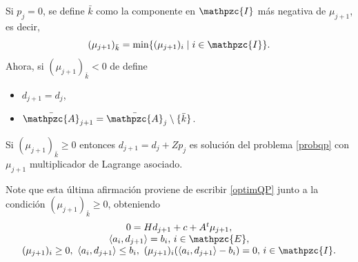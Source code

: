 \documentclass[a4paper,10pt]{book}
\newcommand{\cI}{\mathpzc{I}}
\newcommand{\cE}{\mathpzc{E}}
\newcommand{\cA}{\mathpzc{A}}
\newcommand{\la}{\langle}
\newcommand{\ra}{\rangle}
\begin{document}
Si $p_j=0$, se define $\bar k$ como la componente en $\cI$ más negativa de $\mu_{j+1}$, es decir,
\[
 (\mu_{j+1})_{\bar k}=\min\{(\mu_{j+1})_i\mid i\in\cI\}.
\]
Ahora, si $(\mu_{j+1})_{\bar k}<0$ de define
\begin{itemize}
 \item $d_{j+1}=d_j$,
 \item $\bar\cA_{j+1}=\bar\cA_j\setminus\{\bar k\}$.
\end{itemize}
Si $(\mu_{j+1})_{\bar k}\geq 0$ entonces $d_{j+1}=d_j+Zp_j$ es solución del problema \eqref{probqp} con $\mu_{j+1}$ multiplicador de Lagrange asociado.

Note que esta última afirmación proviene de escribir \eqref{optimQP} junto a la condición $(\mu_{j+1})_{\bar k}\geq 0$, obteniendo
\[
 \begin{array}{c}
0=Hd_{j+1}+c+ A^t\mu_{j+1},\\
\la a_i,d_{j+1}\ra =b_i, \, i\in \cE,\\
(\mu_{j+1})_i \geq 0, \ \la a_i,d_{j+1}\ra\leq b_i, \ (\mu_{j+1})_i(\la a_i,d_{j+1}\ra-b_i)=0, \, i\in \cI.
\end{array}
\]




% 
\end{document}
